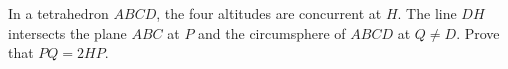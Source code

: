 In a tetrahedron $ABCD$, the four altitudes are concurrent at $H$. The line $DH$ intersects the plane $ABC$ at $P$ and the circumsphere of $ABCD$ at $Q\neq D$. Prove that $PQ=2HP$.